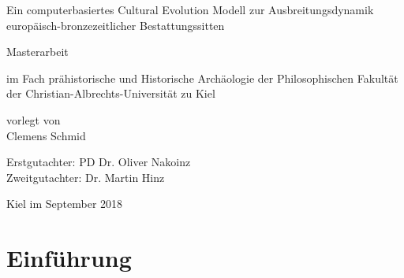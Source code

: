 \documentclass[openany,twoside,twocolumn]{book}
\title{}
\author{}
\date{}
\begin{document}
\begin{titlepage}

  \vspace*{\fill}

    \begin{center}

        \Huge Ein computerbasiertes Cultural Evolution Modell zur Ausbreitungsdynamik europäisch-bronzezeitlicher Bestattungssitten

        \vspace{2cm}

        \huge Masterarbeit

        \large im Fach prähistorische und Historische Archäologie der Philosophischen Fakultät der Christian-Albrechts-Universität zu Kiel

        \vspace{2cm}

        \large vorlegt von \\
        \huge Clemens Schmid

    \end{center}

\vspace{4cm}

\large Erstgutachter: PD Dr. Oliver Nakoinz \\
\large Zweitgutachter: Dr. Martin Hinz

\vspace{1cm}

\large Kiel im September 2018

  \vspace*{\fill}

\end{titlepage}

\renewcommand{\chaptermark}[1]{\markboth{#1}{}}
\renewcommand{\sectionmark}[1]{\markright{\thesection\ #1}}
\fancyhf{}
\fancyhead[LE,RO]{\textbf{\thepage}}
\fancyhead[LO]{\textbf{\nouppercase{\rightmark}}}
\fancyhead[RE]{\textbf{\nouppercase{\leftmark}}}

\setcounter{tocdepth}{3}
\tableofcontents

\parskip 4pt \setlength{\textfloatsep}{10pt plus 1.0pt minus 2.0pt}

\AtEndDocument{
  
}

\hypertarget{intro}{%
\chapter{Einführung}\label{intro}}
\end{document}
